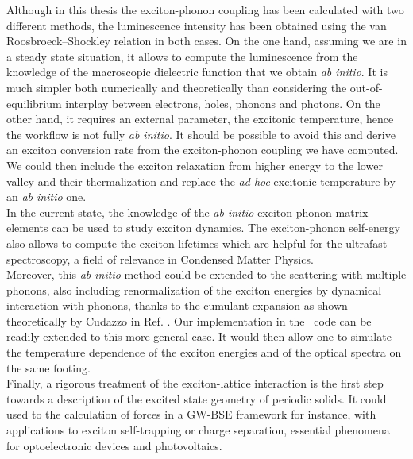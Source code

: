 Although in this thesis the exciton-phonon coupling has been calculated with two different methods, the luminescence intensity has been obtained using the van Roosbroeck--Shockley relation in both cases. On the one hand, assuming we are in a steady state situation, it allows to compute the luminescence from the knowledge of the macroscopic dielectric function that we obtain \textit{ab initio}. It is much simpler both numerically and theoretically than considering the out-of-equilibrium interplay between electrons, holes, phonons and photons. On the other hand, it requires an external parameter, the excitonic temperature, hence the workflow is not fully \textit{ab initio}. It should be possible to avoid this and derive an exciton conversion rate from the exciton-phonon coupling we have computed. We could then include the exciton relaxation from higher energy to the lower valley and their thermalization and replace the \textit{ad hoc} excitonic temperature by an \textit{ab initio} one.\\

In the current state, the knowledge of the \textit{ab initio} exciton-phonon matrix elements can be used to study exciton dynamics.\cite{cohen2023phonon} The exciton-phonon self-energy also allows to compute the exciton lifetimes which are helpful for the ultrafast spectroscopy, a field of relevance in Condensed Matter Physics.\\

Moreover, this \textit{ab initio} method could be extended to the scattering with multiple phonons, also including renormalization of the exciton energies by dynamical interaction with phonons, thanks to the cumulant expansion as shown theoretically by Cudazzo in Ref. \cite{cudazzo2020first}. Our implementation in the \yambo~code can be readily extended to this more general case. It would then allow one to simulate the temperature dependence of the exciton energies and of the optical spectra on the same footing.\\


Finally, a rigorous treatment of the exciton-lattice interaction is the first step towards a description of the excited state geometry of periodic solids. It could used to the calculation of forces in a GW-BSE framework for instance, with applications to exciton self-trapping or charge separation, essential phenomena for optoelectronic devices and photovoltaics.

